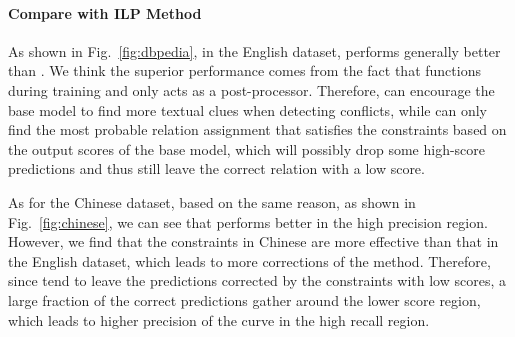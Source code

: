 \paragraph{Compare with ILP Method}
As shown in Fig.~\ref{fig:dbpedia}, in the English dataset, \SL performs generally better than \ILP.
We think the superior performance comes from the fact that \SL functions during training and \ILP only acts as a post-processor.
Therefore, \SL can encourage the base model to find more textual clues when detecting conflicts, while \ILP can only find the most probable relation assignment that satisfies the constraints based on the output scores of the base model, which will possibly drop some high-score predictions and thus still leave the correct relation with a low score.

As for the Chinese dataset, based on the same reason, as shown in Fig.~\ref{fig:chinese}, we can see that \SL performs better in the high precision region.
However, we find that the constraints in Chinese are more effective than that in the English dataset, which leads to more corrections of the \ILP method.
Therefore, since \ILP tend to leave the predictions corrected by the constraints with low scores, a large fraction of the correct predictions gather around the lower score region, which leads to higher precision of the \ILP curve in the high recall region.




